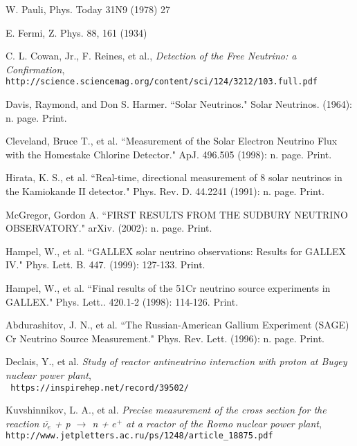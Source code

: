 \clearpage
\newpage
\begin{thebibliography}{20} %
\singlespacing

W. Pauli, Phys. Today 31N9 (1978) 27

E. Fermi, Z. Phys. 88, 161 (1934)

  C. L. Cowan, Jr., F. Reines, et al., \emph{Detection of the Free Neutrino: a Confirmation}, \\
  \texttt{http://science.sciencemag.org/content/sci/124/3212/103.full.pdf}

Davis, Raymond, and Don S. Harmer. ``Solar Neutrinos." Solar Neutrinos. (1964): n. page. Print.

Cleveland, Bruce T., et al. ``Measurement of the Solar Electron Neutrino Flux with the Homestake Chlorine Detector." ApJ. 496.505 (1998): n. page. Print.

Hirata, K. S., et al. ``Real-time, directional measurement of 8 solar neutrinos in the Kamiokande II detector." Phys. Rev. D. 44.2241 (1991): n. page. Print.

McGregor, Gordon A. ``FIRST RESULTS FROM THE SUDBURY NEUTRINO OBSERVATORY." arXiv. (2002): n. page. Print.

Hampel, W., et al. ``GALLEX solar neutrino observations: Results for GALLEX IV." Phys. Lett. B. 447. (1999): 127-133. Print.

Hampel, W., et al. ``Final results of the 51Cr neutrino source experiments in GALLEX." Phys. Lett.. 420.1-2 (1998): 114-126. Print.

Abdurashitov, J. N., et al. ``The Russian-American Gallium Experiment (SAGE) Cr Neutrino Source Measurement."  Phys. Rev. Lett. (1996): n. page. Print.

Declais, Y., et al. \emph{Study of reactor antineutrino interaction with proton at Bugey nuclear power plant},\\
  \texttt{ https://inspirehep.net/record/39502/}

Kuvshinnikov, L. A., et al. \emph{Precise measurement of the cross section for the reaction $\overline{\nu_e}$ + p $\rightarrow$ n + $e^+$ at a reactor of the Rovno nuclear power plant},\\
  \texttt{http://www.jetpletters.ac.ru/ps/1248/article\_18875.pdf}


\end{thebibliography}
